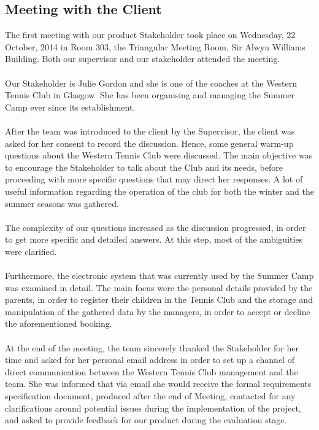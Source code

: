 \documentclass{l3proj}
\begin{document}
\subsection{Meeting with the Client}
\par
The first meeting with our product Stakeholder took place on Wednesday, 22 October, 2014 in Room 303, the Triangular Meeting Room, Sir Alwyn Williams Building. Both our supervisor and our stakeholder attended the meeting.\\
\\
Our Stakeholder is Julie Gordon and she is one of the coaches at the Western Tennis Club in Glasgow. She has been organising and managing the Summer Camp ever since its establishment.\\
\\
After the team was introduced to the client by the Supervisor, the client was asked for her consent to record the discussion. Hence,  some general warm-up questions about the Western Tennis Club were discussed. The main objective was to encourage the Stakeholder to talk about the Club and its needs, before proceeding with more specific questions that may direct her responses. A lot of useful information regarding the operation of the club for both the winter and the summer seasons was gathered.\\
\\
The complexity of our questions increased as the discussion progressed, in order to get more specific and detailed answers. At this step, most of the ambiguities were clarified.\\
\\
Furthermore,  the electronic system that was currently used by the Summer Camp was examined in detail. The main focus were the personal details provided by the parents, in order to register their children in the Tennis Club and the storage and manipulation of the gathered data by the managers, in order to accept or decline the aforementioned booking.\\
\\
At the end of the meeting, the team sincerely thanked the Stakeholder for her time and asked for her personal email address in order to set up a channel of direct communication between the Western Tennis Club management and the team. She was informed that via email she would receive the formal requirements specification document, produced after the end of Meeting, contacted for any clarifications around potential issues during the implementation of the project, and  asked to provide feedback for our product during the evaluation stage.
\end{document}

